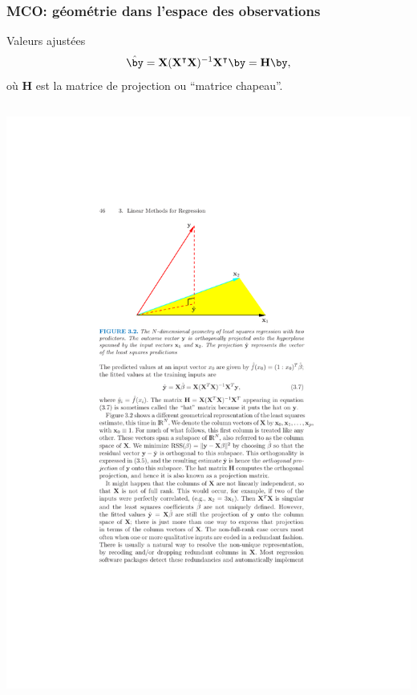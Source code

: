 \documentclass{beamer}\usepackage[]{graphicx}\usepackage[]{color}
\begin{document}
\begin{frame}
  \frametitle{MCO: géométrie dans l'espace des observations}

  \begin{block}{Valeurs ajustées}
    \begin{equation*}
    \hat{\by} = \mathbf{X}(\mathbf{X}^\intercal\mathbf{X})^{- 1}\mathbf{X}^\intercal \by = \mathbf{H}\by,
  \end{equation*}
  où $\mathbf{H}$ est la matrice de projection ou ``matrice chapeau''.
\end{block}
  \begin{columns}[c]
    \begin{column}{.5\textwidth}
      \begin{center}
        \includegraphics{figures/geo_sample}
      \end{center}
    \end{column}

\end{columns}
\end{frame}
\end{document}
